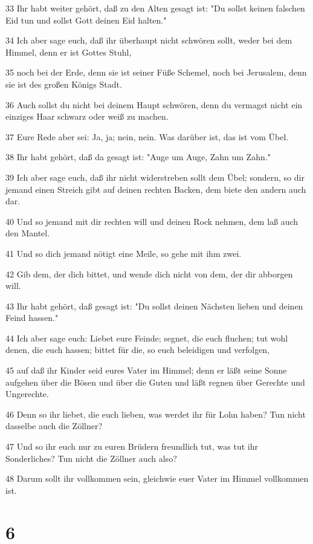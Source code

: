 \par 33 Ihr habt weiter gehört, daß zu den Alten gesagt ist: "Du sollst keinen falschen Eid tun und sollst Gott deinen Eid halten."
\par 34 Ich aber sage euch, daß ihr überhaupt nicht schwören sollt, weder bei dem Himmel, denn er ist Gottes Stuhl,
\par 35 noch bei der Erde, denn sie ist seiner Füße Schemel, noch bei Jerusalem, denn sie ist des großen Königs Stadt.
\par 36 Auch sollst du nicht bei deinem Haupt schwören, denn du vermagst nicht ein einziges Haar schwarz oder weiß zu machen.
\par 37 Eure Rede aber sei: Ja, ja; nein, nein. Was darüber ist, das ist vom Übel.
\par 38 Ihr habt gehört, daß da gesagt ist: "Auge um Auge, Zahn um Zahn."
\par 39 Ich aber sage euch, daß ihr nicht widerstreben sollt dem Übel; sondern, so dir jemand einen Streich gibt auf deinen rechten Backen, dem biete den andern auch dar.
\par 40 Und so jemand mit dir rechten will und deinen Rock nehmen, dem laß auch den Mantel.
\par 41 Und so dich jemand nötigt eine Meile, so gehe mit ihm zwei.
\par 42 Gib dem, der dich bittet, und wende dich nicht von dem, der dir abborgen will.
\par 43 Ihr habt gehört, daß gesagt ist: "Du sollst deinen Nächsten lieben und deinen Feind hassen."
\par 44 Ich aber sage euch: Liebet eure Feinde; segnet, die euch fluchen; tut wohl denen, die euch hassen; bittet für die, so euch beleidigen und verfolgen,
\par 45 auf daß ihr Kinder seid eures Vater im Himmel; denn er läßt seine Sonne aufgehen über die Bösen und über die Guten und läßt regnen über Gerechte und Ungerechte.
\par 46 Denn so ihr liebet, die euch lieben, was werdet ihr für Lohn haben? Tun nicht dasselbe auch die Zöllner?
\par 47 Und so ihr euch nur zu euren Brüdern freundlich tut, was tut ihr Sonderliches? Tun nicht die Zöllner auch also?
\par 48 Darum sollt ihr vollkommen sein, gleichwie euer Vater im Himmel vollkommen ist.

\chapter{6}

